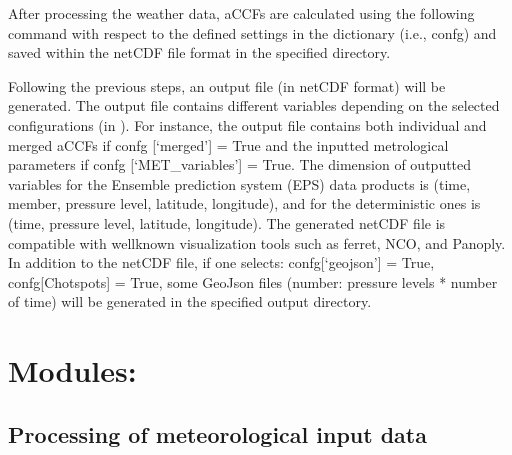 \documentclass[a4paper,11pt,english]{sphinxmanual}
\begin{document}
\sphinxAtStartPar
After processing the weather data, aCCFs are calculated using the following command with respect to the defined settings in the dictionary (i.e., confg) and saved within the netCDF file format in the specified directory.

\begin{sphinxVerbatim}[commandchars=\\\{\}]
\end{sphinxVerbatim}

\sphinxAtStartPar
Following the previous steps, an output file (in netCDF format) will be generated. The output file contains different variables depending on the selected configurations (in ).
For instance, the output file contains both individual and merged aCCFs  if confg {[}‘merged’{]} = True and the inputted metrological parameters if confg {[}‘MET\_variables’{]} = True. The dimension of outputted variables for the Ensemble prediction system (EPS) data products is (time, member, pressure level, latitude, longitude), and for the deterministic ones is (time, pressure level, latitude, longitude).
The generated netCDF file is compatible with well\sphinxhyphen{}known visualization tools such as ferret, NCO, and Panoply.
In addition to the netCDF file, if one selects: confg{[}‘geojson’{]} = True, confg{[}Chotspots{]} = True, some GeoJson files (number: pressure levels * number of time) will be generated in the specified output directory.


\chapter{Modules:}
\label{\detokenize{index:modules}}
\sphinxstepscope


\section{Processing of meteorological input data}
\label{\detokenize{modules:module-envlib.extract_data}}\label{\detokenize{modules:processing-of-meteorological-input-data}}\label{\detokenize{modules::doc}}
\end{document}
